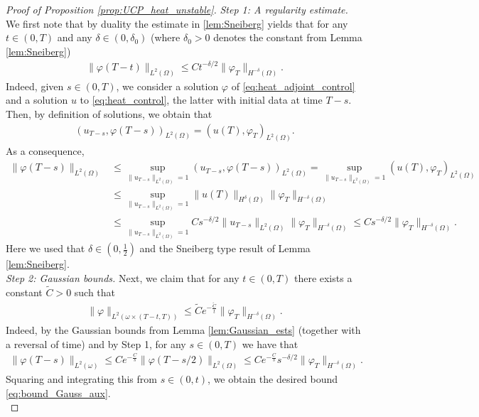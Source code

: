 \documentclass[12pt,twoside]{amsart}
\numberwithin{equation}{section}
\renewcommand{\leq}{\leqslant}
\begin{document}
\begin{proof}[Proof of Proposition \ref{prop:UCP_heat_unstable}]
\emph{Step 1: A regularity estimate.} We first note that by duality the estimate in \eqref{lem:Sneiberg} yields that for any $t\in (0,T)$ and any $\delta \in (0,\delta_0)$ (where $\delta_0>0$ denotes the constant from Lemma \ref{lem:Sneiberg})
\begin{align*}
\|\varphi(T-t)\|_{L^2(\Omega)} \leq C t^{-\delta/2} \|\varphi_T\|_{H^{-\delta}(\Omega)}.
\end{align*}
Indeed, given $s\in (0,T)$, we consider a solution $\varphi$ of \eqref{eq:heat_adjoint_control} and a solution $u$ to \eqref{eq:heat_control}, the latter with initial data at time $T-s$. Then, by definition of solutions, we obtain that
\begin{align*}
(u_{T-s}, \varphi(T-s))_{L^2(\Omega)} = (u(T), \varphi_T)_{L^2(\Omega)}.
\end{align*}
As a consequence,
\begin{align*}
\|\varphi(T-s)\|_{L^2(\Omega)} 
&\leq \sup\limits_{\|u_{T-s}\|_{L^2(\Omega)} = 1} (u_{T-s}, \varphi(T-s))_{L^2(\Omega)}
= \sup\limits_{\|u_{T-s}\|_{L^2(\Omega)} = 1} (u(T), \varphi_{T})_{L^2(\Omega)}\\
& \leq \sup\limits_{\|u_{T-s}\|_{L^2(\Omega)} = 1} \|u(T)\|_{H^{\delta}(\Omega)} \|\varphi_T\|_{H^{-\delta}(\Omega)}\\
& \leq \sup\limits_{\|u_{T-s}\|_{L^2(\Omega)} = 1} C s^{-\delta/2} \|u_{T-s}\|_{L^2(\Omega)} \|\varphi_T\|_{H^{-\delta}(\Omega)}
\leq C s^{-\delta/2} \|\varphi_T\|_{H^{-\delta}(\Omega)}.
\end{align*}
Here we used that $\delta \in (0,\frac{1}{2})$ and the Sneiberg type result of Lemma \ref{lem:Sneiberg}.\\

\emph{Step 2: Gaussian bounds.}
Next, we claim that for any $t\in (0,T)$ there exists a constant $\tilde{C}>0$ such that
\begin{align}
\label{eq:bound_Gauss_aux}
\|\varphi\|_{L^2(\omega \times (T-t,T))} \leq \tilde{C} e^{- \frac{\tilde{C}}{t}} \|\varphi_{T}\|_{H^{-\delta}(\Omega)}.
\end{align}
Indeed, by the Gaussian bounds from Lemma \ref{lem:Gaussian_ests} (together with a reversal of time) and by Step 1, for any $s\in (0,T)$ we have that
\begin{align*}
\|\varphi(T-s)\|_{L^2(\omega)} \leq C e^{- \frac{C}{s}} \|\varphi(T-s/2)\|_{L^2(\Omega)} \leq C e^{-\frac{C}{s}} s^{-\delta/2} \|\varphi_T\|_{H^{-\delta}(\Omega)}.
\end{align*}
Squaring and integrating this from $s\in (0,t)$, we obtain
the desired bound \eqref{eq:bound_Gauss_aux}.\\


\end{proof}
\end{document}
